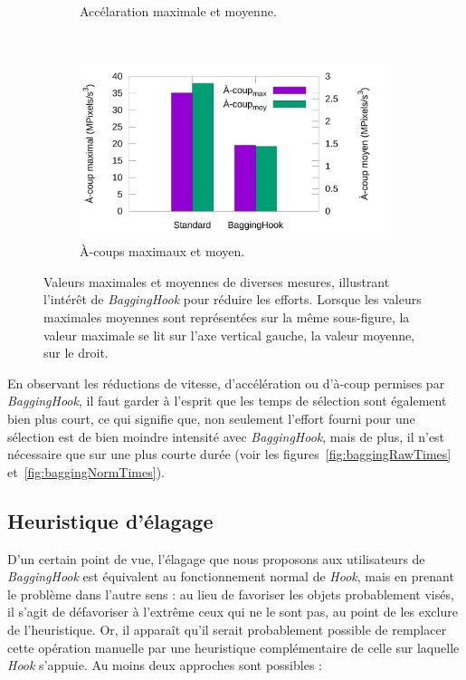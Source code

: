 \begin{figure}[htb]
\begin{subfigure}[t]{0.49\textwidth}
			\caption{Accélaration maximale et moyenne.}
			\label{fig:accelHisto}
		\end{subfigure}
		~
		\begin{subfigure}[t]{0.49\textwidth}
			\centering
			\includegraphics[width=\textwidth]{figures/ch5/jerkHisto}
			\caption{À-coups maximaux et moyen.}
			\label{fig:jerkHisto}
		\end{subfigure}
		\caption[\emph{BaggingHook} -- effort physique]{Valeurs maximales et moyennes de diverses mesures, illustrant l'intérêt de \emph{BaggingHook} pour réduire les efforts. Lorsque les valeurs maximales moyennes sont représentées sur la même sous-figure, la valeur maximale se lit sur l'axe vertical gauche, la valeur moyenne, sur le droit.}
		\label{fig:baggingHookCursorStats}
	\end{figure}
	
	En observant les réductions de vitesse, d'accélération ou d'à-coup permises par \emph{BaggingHook}, il faut garder à l'esprit que les temps de sélection sont également bien plus court, ce qui signifie que, non seulement l'effort fourni pour une sélection est de bien moindre intensité avec \emph{BaggingHook}, mais de plus, il n'est nécessaire que sur une plus courte durée (voir les figures~\ref{fig:baggingRawTimes} et~\ref{fig:baggingNormTimes}).
	
	
	\subsection{Heuristique d'élagage}
	D'un certain point de vue, l'élagage que nous proposons aux utilisateurs de \emph{BaggingHook} est équivalent au fonctionnement normal de \emph{Hook}, mais en prenant le problème dans l'autre sens : au lieu de favoriser les objets probablement visés, il s'agit de défavoriser à l'extrême ceux qui ne le sont pas, au point de les exclure de l'heuristique. Or, il apparaît qu'il serait probablement possible de remplacer cette opération manuelle par une heuristique complémentaire de celle sur laquelle \emph{Hook} s'appuie. Au moins deux approches sont possibles :
	
